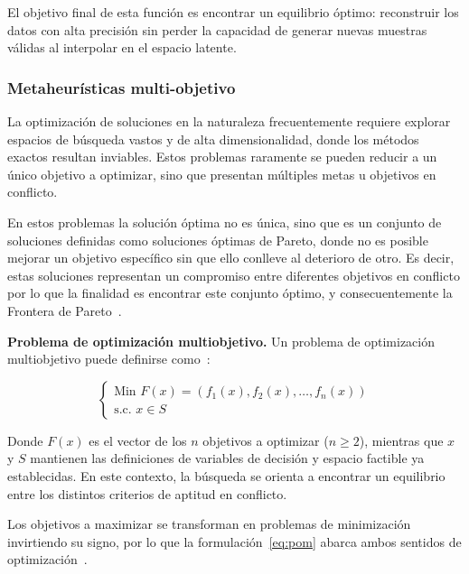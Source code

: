 El objetivo final de esta función es encontrar un equilibrio óptimo: reconstruir los datos con alta precisión sin perder la capacidad de generar nuevas muestras válidas al interpolar en el espacio latente.

\subsubsection{Metaheurísticas multi-objetivo}
\label{subsec:metaheuristicas_multiobjetivo}
\label{sec:opt_multiobjetivo}
\label{subsec:pareto}

La optimización de soluciones en la naturaleza frecuentemente requiere explorar espacios de búsqueda vastos y de alta dimensionalidad, donde los métodos exactos resultan inviables. Estos problemas raramente se pueden reducir a un único objetivo a optimizar, sino que presentan múltiples metas u objetivos en conflicto.

En estos problemas la solución óptima no es única, sino que es un conjunto de soluciones definidas como soluciones óptimas de Pareto, donde no es posible mejorar un objetivo específico sin que ello conlleve al deterioro de otro. Es decir, estas soluciones representan un compromiso entre diferentes objetivos en conflicto por lo que la finalidad es encontrar este conjunto óptimo, y consecuentemente la Frontera de Pareto~\cite{talbi2009metaheuristics}.

\textbf{Problema de optimización multiobjetivo.} Un problema de optimización multiobjetivo puede definirse como~\cite{talbi2009metaheuristics}:

\begin{equation}
\label{eq:pom}
\begin{cases}
\text{Min } F(x) = (f_1(x), f_2(x), \ldots, f_n(x)) \\
\text{s.c. } x \in S
\end{cases}
\end{equation}

Donde $F(x)$ es el vector de los $n$ objetivos a optimizar ($n \geq 2$), mientras que $x$ y $S$ mantienen las definiciones de variables de decisión y espacio factible ya establecidas. En este contexto, la búsqueda se orienta a encontrar un equilibrio entre los distintos criterios de aptitud en conflicto.

Los objetivos a maximizar se transforman en problemas de minimización invirtiendo su signo, por lo que la formulación~\eqref{eq:pom} abarca ambos sentidos de optimización~\cite{talbi2009metaheuristics}.

